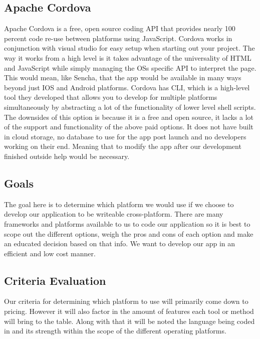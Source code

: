 \documentclass[letterpaper,10pt,draftclsnofoot,onecolumn,titlepage]{IEEEtran}
\begin{document}
	\subsection{Apache Cordova}
		Apache Cordova is a free, open source coding API that provides nearly 100 percent code re-use between platforms using JavaScript. Cordova works in conjunction with visual studio for easy setup when starting out your project. The way it works from a high level is it takes advantage of the universality of HTML and JavaScript while simply managing the OSs specific API to interpret the page. This would mean, like Sencha, that the app would be available in many ways beyond just IOS and Android platforms. Cordova has CLI, which is a high-level tool they developed that allows you to develop for multiple platforms simultaneously by abstracting a lot of the functionality of lower level shell scripts. The downsides of this option is because it is a free and open source, it lacks a lot of the support and functionality of the above paid options. It does not have built in cloud storage, no database to use for the app post launch and no developers working on their end. Meaning that to modify the app after our development finished outside help would be necessary.
	\subsection{Goals}
		The goal here is to determine which platform we would use if we choose to develop our application to be writeable cross-platform. There are many frameworks and platforms available to us to code our application so it is best to scope out the different options, weigh the pros and cons of each option and make an educated decision based on that info. We want to develop our app in an efficient and low cost manner.
	\subsection{Criteria Evaluation}
		Our criteria for determining which platform to use will primarily come down to pricing. However it will also factor in the amount of features each tool or method will bring to the table. Along with that it will be noted the language being coded in and its strength within the scope of the different operating platforms.
\end{document}
